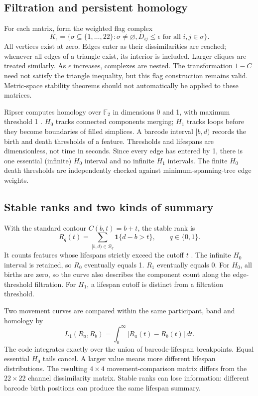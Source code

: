 \documentclass[11pt,a4paper]{article}
\newcommand{\ind}{\mathbf{1}}
\begin{document}
\subsection{Filtration and persistent homology}
For each matrix, form the weighted flag complex
\begin{equation}
 K_\epsilon=\{\sigma\subseteq\{1,\ldots,22\}:\sigma\ne\varnothing,
 D_{ij}\leq\epsilon\text{ for all }i,j\in\sigma\}.
\end{equation}
All vertices exist at zero. Edges enter as their dissimilarities are reached; whenever all edges of a triangle exist, its interior is included. Larger cliques are treated similarly. As $\epsilon$ increases, complexes are nested. The transformation $1-C$ need not satisfy the triangle inequality, but this flag construction remains valid. Metric-space stability theorems should not automatically be applied to these matrices.

Ripser computes homology over $\mathbb F_2$ in dimensions 0 and 1, with maximum threshold 1 \cite{ripser}. $H_0$ tracks connected components merging; $H_1$ tracks loops before they become boundaries of filled simplices. A barcode interval $[b,d)$ records the birth and death thresholds of a feature. Thresholds and lifespans are dimensionless, not time in seconds. Since every edge has entered by 1, there is one essential (infinite) $H_0$ interval and no infinite $H_1$ intervals. The finite $H_0$ death thresholds are independently checked against minimum-spanning-tree edge weights.

\subsection{Stable ranks and two kinds of summary}
With the standard contour $C(b,t)=b+t$, the stable rank is
\begin{equation}
 R_q(t)=\sum_{[b,d)\in\mathcal B_q}\ind\{d-b>t\},\qquad q\in\{0,1\}.
\end{equation}
It counts features whose lifespans strictly exceed the cutoff $t$ \cite{chacholski2020}. The infinite $H_0$ interval is retained, so $R_0$ eventually equals 1. $R_1$ eventually equals 0. For $H_0$, all births are zero, so the curve also describes the component count along the edge-threshold filtration. For $H_1$, a lifespan cutoff is distinct from a filtration threshold.

Two movement curves are compared within the same participant, band and homology by
\begin{equation}
 L_1(R_a,R_b)=\int_0^\infty |R_a(t)-R_b(t)|\,dt.
\end{equation}
The code integrates exactly over the union of barcode-lifespan breakpoints. Equal essential $H_0$ tails cancel. A larger value means more different lifespan distributions. The resulting $4\times4$ movement-comparison matrix differs from the $22\times22$ channel dissimilarity matrix. Stable ranks can lose information: different barcode birth positions can produce the same lifespan summary.
\end{document}

